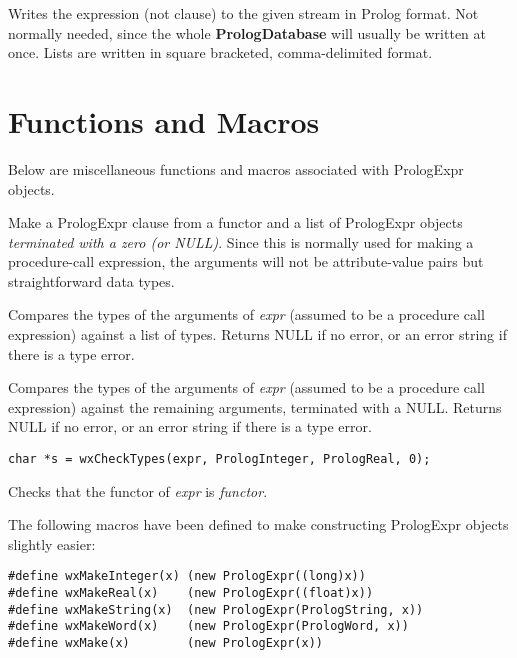 

Writes the expression (not clause) to the given stream in Prolog
format. Not normally needed, since the whole {\bf PrologDatabase} will
usually be written at once. Lists are written in square bracketed,
comma-delimited format.

\section{Functions and Macros}

Below are miscellaneous functions and macros associated with PrologExpr objects.



Make a PrologExpr clause from a functor and a list of PrologExpr
objects {\it terminated with a zero (or NULL)}. Since this is normally
used for making a procedure-call expression, the arguments will not be
attribute-value pairs but straightforward data types.


Compares the types of the arguments of {\it expr} (assumed to be a
procedure call expression) against a list of types. Returns NULL if no error, or an error string if there is a
type error.


Compares the types of the arguments of {\it expr} (assumed to be a
procedure call expression) against the remaining arguments, terminated
with a NULL. Returns NULL if no error, or an error string if there is a
type error.

\begin{verbatim}
char *s = wxCheckTypes(expr, PrologInteger, PrologReal, 0);
\end{verbatim}


Checks that the functor of {\it expr} is {\it functor}.


The following macros have been defined to make constructing PrologExpr
objects slightly easier:

\begin{verbatim}
#define wxMakeInteger(x) (new PrologExpr((long)x))
#define wxMakeReal(x)    (new PrologExpr((float)x))
#define wxMakeString(x)  (new PrologExpr(PrologString, x))
#define wxMakeWord(x)    (new PrologExpr(PrologWord, x))
#define wxMake(x)        (new PrologExpr(x))
\end{verbatim}

